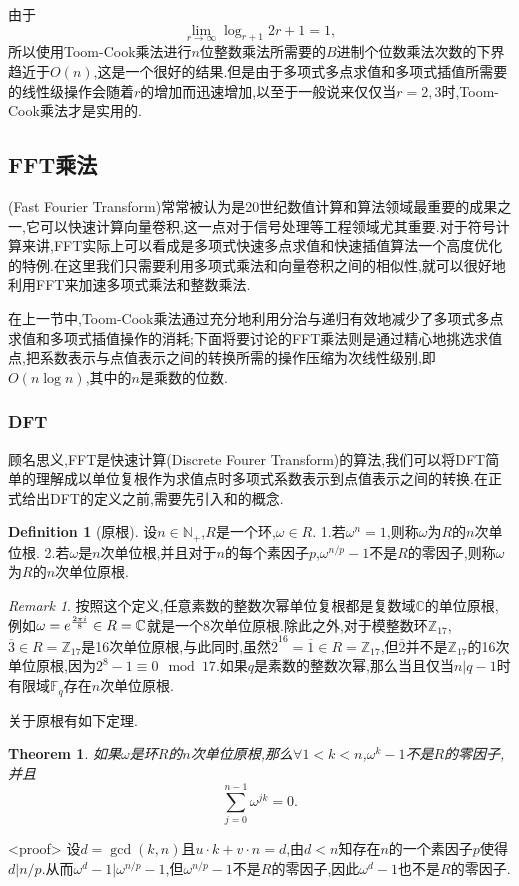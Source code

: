 \documentclass{ctexart}
\newtheorem{theorem}{Theorem}
\theoremstyle{remark}
\newtheorem{remark}{Remark}
\theoremstyle{definition}
\newtheorem{definition}{Definition}[section]
\begin{document}
由于$$\lim_{r\rightarrow\infty}\log_{r+1}{2r+1}=1,$$所以使用Toom-Cook乘法进行$n$位整数乘法所需要的$B$进制个位数乘法次数的下界趋近于$O(n)$,这是一个很好的结果.但是由于多项式多点求值和多项式插值所需要的线性级操作会随着$r$的增加而迅速增加,以至于一般说来仅仅当$r=2,3$时,Toom-Cook乘法才是实用的.

\subsection{FFT乘法}

(Fast Fourier Transform)常常被认为是20世纪数值计算和算法领域最重要的成果之一,它可以快速计算向量卷积,这一点对于信号处理等工程领域尤其重要.对于符号计算来讲,FFT实际上可以看成是多项式快速多点求值和快速插值算法一个高度优化的特例.在这里我们只需要利用多项式乘法和向量卷积之间的相似性,就可以很好地利用FFT来加速多项式乘法和整数乘法.

在上一节中,Toom-Cook乘法通过充分地利用分治与递归有效地减少了多项式多点求值和多项式插值操作的消耗;下面将要讨论的FFT乘法则是通过精心地挑选求值点,把系数表示与点值表示之间的转换所需的操作压缩为次线性级别,即$O(n\log{n})$,其中的$n$是乘数的位数.

\subsubsection{DFT}

顾名思义,FFT是快速计算(Discrete Fourer Transform)的算法,我们可以将DFT简单的理解成以单位复根作为求值点时多项式系数表示到点值表示之间的转换.在正式给出DFT的定义之前,需要先引入和的概念.

\begin{definition}[原根]
设$n\in\mathbb{N}_+$,$R$是一个环,$\omega\in R$.
 1.若$\omega^n=1$,则称$\omega$为$R$的$n$次单位根.
 2.若$\omega$是$n$次单位根,并且对于$n$的每个素因子$p$,$\omega^{n/p}-1$不是$R$的零因子,则称$\omega$为$R$的$n$次单位原根.
\end{definition}
\begin{remark}
按照这个定义,任意素数的整数次幂单位复根都是复数域$\mathbb{C}$的单位原根,例如$\omega=e^{{2\pi i\over 8}}\in R=\mathbb{C}$就是一个8次单位原根.除此之外,对于模整数环$\mathbb{Z}_{17}$,$\overline{3}\in R=\mathbb{Z}_{17}$是16次单位原根,与此同时,虽然$\overline{2}^{16}=\overline{1}\in R=\mathbb{Z}_{17}$,但$\overline{2}$并不是$\mathbb{Z}_{17}$的16次单位原根,因为$2^8-1\equiv 0\mod 17$.如果$q$是素数的整数次幂,那么当且仅当$n|q-1$时有限域$\mathbb{F}_q$存在$n$次单位原根.
\end{remark}
关于原根有如下定理.
\begin{theorem}\label{th:primitiveroot}
如果$\omega$是环$R$的$n$次单位原根,那么$\forall 1<k<n$,$\omega^k-1$不是$R$的零因子,并且$$\sum_{j=0}^{n-1}\omega^{jk}=0.$$
\end{theorem}
<proof>
设$d=\gcd(k,n)$且$u\cdot k+v\cdot n=d$,由$d<n$知存在$n$的一个素因子$p$使得$d|n/p$.从而$\omega^d-1|\omega^{n/p}-1$,但$\omega^{n/p}-1$不是$R$的零因子,因此$\omega^d-1$也不是$R$的零因子.
\end{document}

